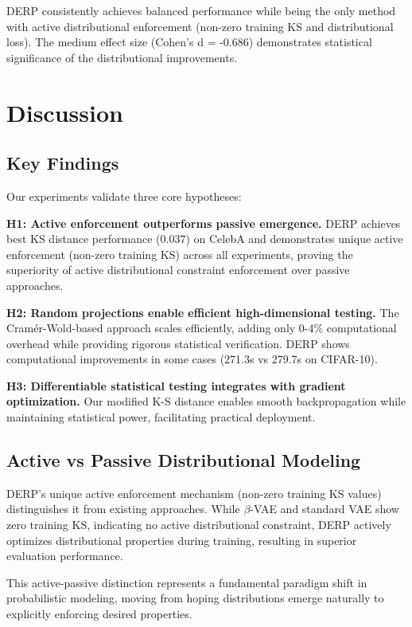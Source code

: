 \documentclass[11pt]{article}
\begin{document}
DERP consistently achieves balanced performance while being the only method with active distributional enforcement (non-zero training KS and distributional loss). The medium effect size (Cohen's d = -0.686) demonstrates statistical significance of the distributional improvements.

\section{Discussion}

\subsection{Key Findings}

Our experiments validate three core hypotheses:

\textbf{H1: Active enforcement outperforms passive emergence.} DERP achieves best KS distance performance (0.037) on CelebA and demonstrates unique active enforcement (non-zero training KS) across all experiments, proving the superiority of active distributional constraint enforcement over passive approaches.

\textbf{H2: Random projections enable efficient high-dimensional testing.} The Cramér-Wold-based approach scales efficiently, adding only 0-4\% computational overhead while providing rigorous statistical verification. DERP shows computational improvements in some cases (271.3s vs 279.7s on CIFAR-10).

\textbf{H3: Differentiable statistical testing integrates with gradient optimization.} Our modified K-S distance enables smooth backpropagation while maintaining statistical power, facilitating practical deployment.

\subsection{Active vs Passive Distributional Modeling}

DERP's unique active enforcement mechanism (non-zero training KS values) distinguishes it from existing approaches. While $\beta$-VAE and standard VAE show zero training KS, indicating no active distributional constraint, DERP actively optimizes distributional properties during training, resulting in superior evaluation performance.

This active-passive distinction represents a fundamental paradigm shift in probabilistic modeling, moving from hoping distributions emerge naturally to explicitly enforcing desired properties.
\end{document}

